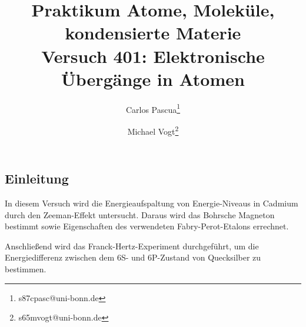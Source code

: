 \documentclass{article}
\title{Praktikum Atome, Moleküle, kondensierte Materie \\ Versuch 401: Elektronische Übergänge in Atomen}
\author[1]{Carlos Pascua\thanks{s87cpasc@uni-bonn.de}}
\author[1]{Michael Vogt\thanks{s65mvogt@uni-bonn.de}}
\affil[1]{Uni Bonn}
\begin{document}
\maketitle
\tableofcontents
\newpage
{}

\pagestyle{fancy}
\fancyhead[R]{\thepage}
\fancyhead[L]{\leftmark}

\begin{multicols}{2}

\section*{Einleitung}
In diesem Versuch wird die Energieaufspaltung von Energie-Niveaus in Cadmium durch den Zeeman-Effekt untersucht.
Daraus wird das Bohrsche Magneton bestimmt sowie Eigenschaften des verwendeten Fabry-Perot-Etalons errechnet.

Anschließend wird das Franck-Hertz-Experiment durchgeführt, um die Energiedifferenz zwischen dem 6S- und 6P-Zustand von Quecksilber zu bestimmen.



\end{multicols}
\end{document}
